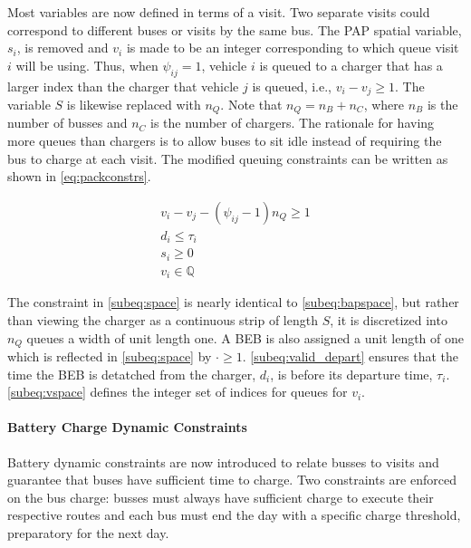 \documentclass[ee,msthesis]{usuthesis}
\begin{document}
Most variables are now defined in terms of a visit. Two separate visits could correspond to different buses or visits by
the same bus. The PAP spatial variable, \(s_i\), is removed and \(v_i\) is made to be an integer corresponding to which
queue visit \(i\) will be using. Thus, when \(\psi_{ij} = 1\), vehicle \(i\) is queued to a charger that has a larger index than
the charger that vehicle \(j\) is queued, i.e., \(v_i-v_j \geq 1\). The variable \(S\) is likewise replaced with \(n_Q\). Note that
\(n_Q = n_B + n_C\), where \(n_B\) is the number of busses and \(n_C\) is the number of chargers. The rationale for having
more queues than chargers is to allow buses to sit idle instead of requiring the bus to charge at each visit. The
modified queuing constraints can be written as shown in \autoref{eq:packconstrs}.

\begin{subequations}
\label{eq:packconstrs}
\begin{align}
    v_i - v_j - (\psi_{ij} - 1)n_Q \geq 1       \label{subeq:space}        \\
    d_i \leq \tau_i                             \label{subeq:valid_depart} \\
    s_i \geq 0                               \label{subeq:pos_charge} \\
    v_i \in \mathbb{Q}                       \label{subeq:vspace}
\end{align}
\end{subequations}

The constraint in \autoref{subeq:space} is nearly identical to \autoref{subeq:bapspace}, but rather than viewing the
charger as a continuous strip of length \(S\), it is discretized into \(n_Q\) queues a width of unit length one. A BEB is
also assigned a unit length of one which is reflected in \autoref{subeq:space} by \(\cdot \geq 1\). \autoref{subeq:valid_depart}
ensures that the time the BEB is detatched from the charger, \(d_i\), is before its departure time, \(\tau_i\).
\autoref{subeq:vspace} defines the integer set of indices for queues for \(v_i\).

\paragraph{Battery Charge Dynamic Constraints}
\label{sec:batt_dynamics}
Battery dynamic constraints are now introduced to relate busses to visits and guarantee that buses have sufficient time
to charge. Two constraints are enforced on the bus charge: busses must always have sufficient charge to execute their
respective routes and each bus must end the day with a specific charge threshold, preparatory for the next day.
\end{document}
